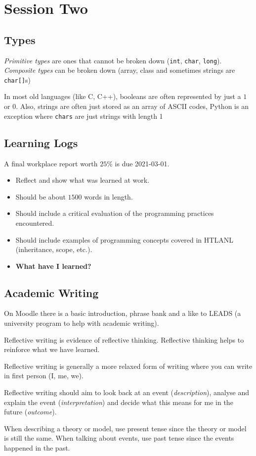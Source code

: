 \section{Session Two}\label{sub:session_2_types}

\subsection{Types}\label{ssub:types}

\emph{Primitive types} are ones that cannot be broken down (\texttt{int}, \texttt{char}, \texttt{long}).
\emph{Composite types} can be broken down (array, class and sometimes strings are \texttt{char[]}s)

\begin{note}
	In most old languages (like C, C++), booleans are often represented by just a \(1\) or  \(0\).
	Also, strings are often just stored as an array of ASCII codes, Python is an exception where \texttt{chars} are just strings with length 1
\end{note}

\subsection{Learning Logs}\label{ssub:learning_logs}

A final workplace report worth \(25\%\) is due 2021-03-01.
\begin{itemize}
	\item Reflect and show what was learned at work.
	\item Should be about \(1500\) words in length.
	\item Should include a critical evaluation of the programming practices encountered.
	\item Should include examples of programming concepts covered in HTLANL (inheritance, scope, etc.).
	\item \textbf{What have I learned?}
\end{itemize}

\subsection{Academic Writing}\label{ssub:academic_writing}

On Moodle there is a basic introduction, phrase bank and a like to LEADS (a university program to help with academic writing).

Reflective writing is evidence of reflective thinking.
Reflective thinking helps to reinforce what we have learned.

Reflective writing is generally a more relaxed form of writing where you can write in first person (I, me, we).

Reflective writing should aim to look back at an event (\emph{description}), analyse and explain the event (\emph{interpretation}) and decide what this means for me in the future (\emph{outcome}).

\begin{note}
	When describing a theory or model, use present tense since the theory or model is still the same.
	When talking about events, use past tense since the events happened in the past.
\end{note}
